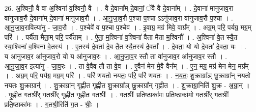 \documentclass[17pt]{extarticle}
\begin{document}
26. अ॒श्विनौ॒ वै वा अ॒श्विना॑ व॒श्विनौ॒ वै । . वै दे॒वाना᳚म् दे॒वानां॒ ॅवै वै दे॒वाना᳚म् । . दे॒वाना॑ मानुजाव॒रा वा॑नुजाव॒रौ दे॒वाना᳚म् दे॒वाना॑ मानुजाव॒रौ । . आ॒नु॒जा॒व॒रौ प॒श्चा प॒श्चा ऽऽनु॑जाव॒रा वा॑नुजाव॒रौ प॒श्चा । . आ॒नु॒जा॒व॒रावित्या॑नु - जा॒व॒रौ । . प॒श्चेवे॑ व प॒श्चा प॒श्चेव॑ । . इ॒वाग्र॒ मग्र॑ मिवे॒ वाग्र᳚म् । . अग्र॒म् परि॒ पर्यग्र॒ मग्र॒म् परि॑ । . पर्यै॑ता मैता॒म् परि॒ पर्यै॑ताम् । . ऐ॒ता॒ म॒श्विना॑ व॒श्विना॑ वैता मैता म॒श्विनौ᳚ । . अ॒श्विना॑ वे॒त स्यै॒त स्या॒श्विना॑ व॒श्विना॑ वे॒तस्य॑ । . ए॒तस्य॑ दे॒वता॑ दे॒व तै॒त स्यै॒तस्य॑ दे॒वता᳚ । . दे॒वता॒ यो यो दे॒वता॑ दे॒वता॒ यः । . य आ॑नुजाव॒र आ॑नुजाव॒रो यो य आ॑नुजाव॒रः । . आ॒नु॒जा॒व॒र स्तौ ता वा॑नुजाव॒र आ॑नुजाव॒र स्तौ । . आ॒नु॒जा॒व॒र इत्या॑नु - जा॒व॒रः । . ता वे॒वैव तौ ता वे॒व । . ए॒वैन॑ मेन मे॒वै वैन᳚म् । . ए॒न॒ मग्र॒ मग्र॑ मेन मेन॒ मग्र᳚म् । . अग्र॒म् परि॒ पर्यग्र॒ मग्र॒म् परि॑ । . परि॑ णयतो नयतः॒ परि॒ परि॑ णयतः । . न॒य॒तः॒ शु॒क्राग्रा᳚ञ् छु॒क्राग्रा᳚न् नयतो नयतः शु॒क्राग्रान्॑ । . शु॒क्राग्रा᳚न् गृह्णीत गृह्णीत शु॒क्राग्रा᳚ञ् छु॒क्राग्रा᳚न् गृह्णीत । . शु॒क्राग्रा॒निति॑ शु॒क्र - अ॒ग्रा॒न् । . गृ॒ह्णी॒त॒ ग॒तश्री᳚र् ग॒तश्री᳚र् गृह्णीत गृह्णीत ग॒तश्रीः᳚ । . ग॒तश्रीः᳚ प्रति॒ष्ठाका॑मः प्रति॒ष्ठाका॑मो ग॒तश्री᳚र् ग॒तश्रीः᳚ प्रति॒ष्ठाका॑मः । . ग॒तश्री॒रिति॑ ग॒त - श्रीः॒ । \newline
\end{document}
